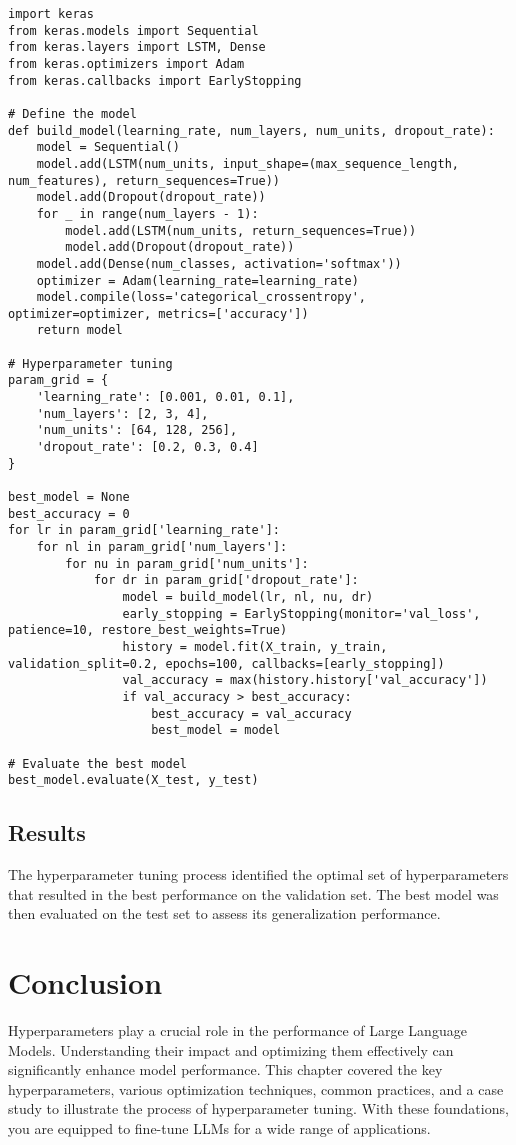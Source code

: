 \begin{verbatim}
import keras
from keras.models import Sequential
from keras.layers import LSTM, Dense
from keras.optimizers import Adam
from keras.callbacks import EarlyStopping

# Define the model
def build_model(learning_rate, num_layers, num_units, dropout_rate):
    model = Sequential()
    model.add(LSTM(num_units, input_shape=(max_sequence_length, num_features), return_sequences=True))
    model.add(Dropout(dropout_rate))
    for _ in range(num_layers - 1):
        model.add(LSTM(num_units, return_sequences=True))
        model.add(Dropout(dropout_rate))
    model.add(Dense(num_classes, activation='softmax'))
    optimizer = Adam(learning_rate=learning_rate)
    model.compile(loss='categorical_crossentropy', optimizer=optimizer, metrics=['accuracy'])
    return model

# Hyperparameter tuning
param_grid = {
    'learning_rate': [0.001, 0.01, 0.1],
    'num_layers': [2, 3, 4],
    'num_units': [64, 128, 256],
    'dropout_rate': [0.2, 0.3, 0.4]
}

best_model = None
best_accuracy = 0
for lr in param_grid['learning_rate']:
    for nl in param_grid['num_layers']:
        for nu in param_grid['num_units']:
            for dr in param_grid['dropout_rate']:
                model = build_model(lr, nl, nu, dr)
                early_stopping = EarlyStopping(monitor='val_loss', patience=10, restore_best_weights=True)
                history = model.fit(X_train, y_train, validation_split=0.2, epochs=100, callbacks=[early_stopping])
                val_accuracy = max(history.history['val_accuracy'])
                if val_accuracy > best_accuracy:
                    best_accuracy = val_accuracy
                    best_model = model

# Evaluate the best model
best_model.evaluate(X_test, y_test)
\end{verbatim}

\subsection{Results}
The hyperparameter tuning process identified the optimal set of hyperparameters that resulted in the best performance on the validation set. The best model was then evaluated on the test set to assess its generalization performance.

\section{Conclusion}
Hyperparameters play a crucial role in the performance of Large Language Models. Understanding their impact and optimizing them effectively can significantly enhance model performance. This chapter covered the key hyperparameters, various optimization techniques, common practices, and a case study to illustrate the process of hyperparameter tuning. With these foundations, you are equipped to fine-tune LLMs for a wide range of applications.

% 
% 